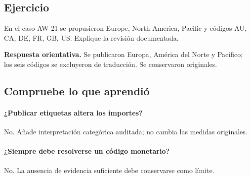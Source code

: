 \subsection{Ejercicio}
En el caso AW 21 se propusieron Europe, North America, Pacific y códigos AU, CA, DE, FR, GB, US. Explique la revisión documentada.

\textbf{Respuesta orientativa.} Se publicaron Europa, América del Norte y Pacífico; los seis códigos se excluyeron de traducción. Se conservaron originales.

\subsection{Compruebe lo que aprendió}
\paragraph{¿Publicar etiquetas altera los importes?} No. Añade interpretación categórica auditada; no cambia las medidas originales.

\paragraph{¿Siempre debe resolverse un código monetario?} No. La ausencia de evidencia suficiente debe conservarse como límite.

\endgroup
{}

